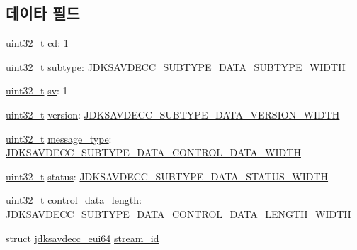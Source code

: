 \subsection*{데이타 필드}
\begin{DoxyCompactItemize}
\item 
\hyperlink{parse_8c_a6eb1e68cc391dd753bc8ce896dbb8315}{uint32\+\_\+t} \hyperlink{structjdksavdecc__acmpdu__common__control__header_a9bdcd90bda4a8763700a1d59c27a6a26}{cd}\+: 1
\item 
\hyperlink{parse_8c_a6eb1e68cc391dd753bc8ce896dbb8315}{uint32\+\_\+t} \hyperlink{structjdksavdecc__acmpdu__common__control__header_aed06f4a516930ca81d204d53c61a1ef3}{subtype}\+: \hyperlink{group__jdksavdecc__subtype__data_ga624227fd72dbec4cbec4f6436024fad8}{J\+D\+K\+S\+A\+V\+D\+E\+C\+C\+\_\+\+S\+U\+B\+T\+Y\+P\+E\+\_\+\+D\+A\+T\+A\+\_\+\+S\+U\+B\+T\+Y\+P\+E\+\_\+\+W\+I\+D\+TH}
\item 
\hyperlink{parse_8c_a6eb1e68cc391dd753bc8ce896dbb8315}{uint32\+\_\+t} \hyperlink{structjdksavdecc__acmpdu__common__control__header_a9eeedef9f348218323834a3cf44d64c4}{sv}\+: 1
\item 
\hyperlink{parse_8c_a6eb1e68cc391dd753bc8ce896dbb8315}{uint32\+\_\+t} \hyperlink{structjdksavdecc__acmpdu__common__control__header_acd99bb05ca015e7d74448acb1deba7ca}{version}\+: \hyperlink{group__jdksavdecc__subtype__data_ga97591e640a971dc293e1416455fb9ee3}{J\+D\+K\+S\+A\+V\+D\+E\+C\+C\+\_\+\+S\+U\+B\+T\+Y\+P\+E\+\_\+\+D\+A\+T\+A\+\_\+\+V\+E\+R\+S\+I\+O\+N\+\_\+\+W\+I\+D\+TH}
\item 
\hyperlink{parse_8c_a6eb1e68cc391dd753bc8ce896dbb8315}{uint32\+\_\+t} \hyperlink{structjdksavdecc__acmpdu__common__control__header_a84c56f5f8c75e0b021f73b2882280040}{message\+\_\+type}\+: \hyperlink{group__jdksavdecc__subtype__data_ga032f46118325ac56a0505490dff24963}{J\+D\+K\+S\+A\+V\+D\+E\+C\+C\+\_\+\+S\+U\+B\+T\+Y\+P\+E\+\_\+\+D\+A\+T\+A\+\_\+\+C\+O\+N\+T\+R\+O\+L\+\_\+\+D\+A\+T\+A\+\_\+\+W\+I\+D\+TH}
\item 
\hyperlink{parse_8c_a6eb1e68cc391dd753bc8ce896dbb8315}{uint32\+\_\+t} \hyperlink{structjdksavdecc__acmpdu__common__control__header_ade20423e91627f07e610924cb0081623}{status}\+: \hyperlink{group__jdksavdecc__subtype__data_ga38a112978fe469b74b7541de23733f50}{J\+D\+K\+S\+A\+V\+D\+E\+C\+C\+\_\+\+S\+U\+B\+T\+Y\+P\+E\+\_\+\+D\+A\+T\+A\+\_\+\+S\+T\+A\+T\+U\+S\+\_\+\+W\+I\+D\+TH}
\item 
\hyperlink{parse_8c_a6eb1e68cc391dd753bc8ce896dbb8315}{uint32\+\_\+t} \hyperlink{structjdksavdecc__acmpdu__common__control__header_ae87a102016a7b6abd96bba5df2ae3768}{control\+\_\+data\+\_\+length}\+: \hyperlink{group__jdksavdecc__subtype__data_ga0bd033997c197fad16adfd5e24708935}{J\+D\+K\+S\+A\+V\+D\+E\+C\+C\+\_\+\+S\+U\+B\+T\+Y\+P\+E\+\_\+\+D\+A\+T\+A\+\_\+\+C\+O\+N\+T\+R\+O\+L\+\_\+\+D\+A\+T\+A\+\_\+\+L\+E\+N\+G\+T\+H\+\_\+\+W\+I\+D\+TH}
\item 
struct \hyperlink{structjdksavdecc__eui64}{jdksavdecc\+\_\+eui64} \hyperlink{structjdksavdecc__acmpdu__common__control__header_af4c017686a11885d1d514c21bcde8160}{stream\+\_\+id}
\end{DoxyCompactItemize}


